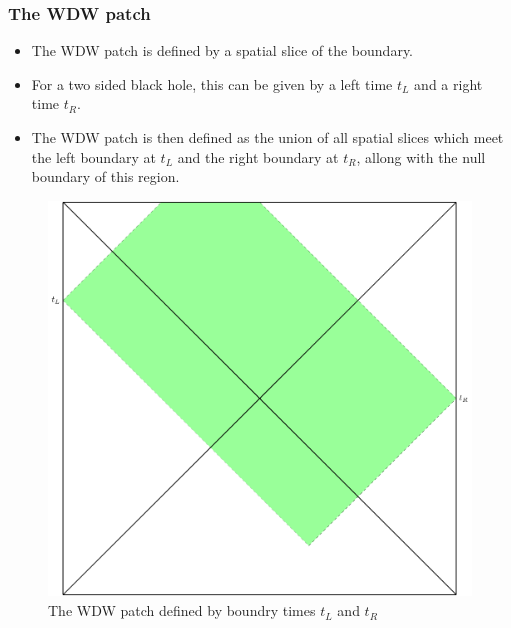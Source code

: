 \documentclass[8pt,aspectratio=169]{beamer}
\begin{document}
\begin{frame}
\frametitle{The WDW patch}

\begin{minipage}[t]{0.55\linewidth}

\begin{itemize}

\item The WDW patch is defined by a spatial slice of the boundary. 

\item For a two sided black hole, this can be given by a left time $t_L$ and a right time $t_R$.

\item The WDW patch is then defined as the union of all spatial slices which meet the left boundary at $t_L$ and the right boundary at $t_R$, allong with the null boundary of this region.

\end{itemize}

\end{minipage}\hfill
%
\begin{minipage}[t]{0.44\linewidth}

\begin{figure}
    \begin{center}
    
        \includegraphics[scale=0.4]{WDW.pdf}    
    
    \end{center}
    \caption{The WDW patch defined by boundry times $t_L$ and $t_R$}
    \label{fig:WDW}
\end{figure}

\end{minipage}

\end{frame}
\end{document}

